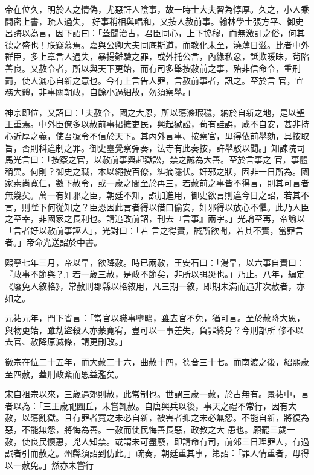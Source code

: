 \begin{pinyinscope}
 帝在位久，明於人之情偽，尤惡訐人陰事，故一時士大夫習為惇厚。久之，小人乘間密上書，疏人過失，
 好事稍相與唱和，又按人赦前事。翰林學士張方平、御史呂誨以為言，因下詔曰：「蓋聞治古，君臣同心，上下協穆，而無激訐之俗，何其德之盛也！朕竊慕焉。嘉與公卿大夫同底斯道，而教化未至，澆薄日滋。比者中外群臣，多上章言人過失，暴揚難驗之罪，或外托公言，內緣私忿，詆欺暖昧，茍陷善良。又赦令者，所以與天下更始，而有司多舉按赦前之事，殆非信命令，重刑罰，使人灑心自新之意也。今有上言告人罪，言赦前事者，訊之。至於言
 官，宜務大體，非事關朝政，自餘小過細故，勿須察舉。」



 神宗即位，又詔曰：「夫赦令，國之大恩，所以蕩滌瑕穢，納於自新之地，是以聖王重焉。中外臣僚多以赦前事捃摭吏民，興起獄訟，茍有詿誤，咸不自安，甚非持心近厚之義，使吾號令不信於天下。其內外言事、按察官，毋得依前舉劾，具按取旨，否則科違制之罪。御史臺覺察彈奏，法寺有此奏按，許舉駁以聞。」知諫院司馬光言曰：「按察之官，以赦前事興起獄訟，禁之誠為大善。至於言事之
 官，事體稍異。何則？御史之職，本以繩按百僚，糾摘隱伏。奸邪之狀，固非一日所為。國家素尚寬仁，數下赦令，或一歲之間至於再三，若赦前之事皆不得言，則其可言者無幾矣。萬一有奸邪之臣，朝廷不知，誤加進用，御史欲言則違今日之詔，若其不言，則陛下何從知之？臣恐因此言者得以借口偷安，奸邪得以放心不懼。此乃人臣之至幸，非國家之長利也。請追改前詔，刊去『言事』兩字。」光論至再，帝諭以「言者好以赦前事誣人」，光對曰：「若
 言之得實，誠所欲聞，若其不實，當罪言者。」帝命光送詔於中書。



 熙寧七年三月，帝以旱，欲降赦。時已兩赦，王安石曰：「湯旱，以六事自責曰：『政事不節與？』若一歲三赦，是政不節矣，非所以弭災也。」乃止。八年，編定《廢免人敘格》，常赦則郡縣以格敘用，凡三期一敘，即期未滿而遇非次赦者，亦如之。



 元祐元年，門下省言：「當官以職事墮曠，雖去官不免，猶可言。至於赦降大恩，與物更始，雖劫盜殺人亦蒙寬宥，豈可以一事差失，負罪終身？今刑部所
 修不以去官、赦降原減條，請更刪改。」



 徽宗在位二十五年，而大赦二十六，曲赦十四，德音三十七。而南渡之後，紹熙歲至四赦，蓋刑政紊而恩益濫矣。



 宋自祖宗以來，三歲遇郊則赦，此常制也。世謂三歲一赦，於古無有。景祐中，言者以為：「三王歲祀圜丘，未嘗輒赦。自唐興兵以後，事天之禮不常行，因有大赦，以蕩亂獄。且有罪者寬之未必自新，被害者抑之未必無怨。不能自新，將復為惡，不能無怨，將悔為善。一赦而使民悔善長惡，政教之大
 患也。願罷三歲一赦，使良民懷惠，兇人知禁。或謂未可盡廢，即請命有司，前郊三日理罪人，有過誤者引而赦之。州縣須詔到仿此。」疏奏，朝廷重其事，第詔：「罪人情重者，毋得以一赦免。」然亦未嘗行



\end{pinyinscope}